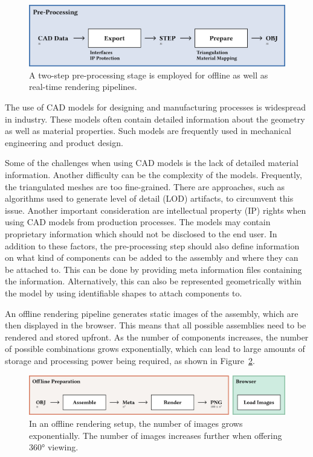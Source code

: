 \begin{figure}[H]
  \centering
  \includegraphics[width=0.9\columnwidth]{resources/cad-pipeline-preprocessing.png}
  \caption{A two-step pre-processing stage is employed for offline as well as real-time rendering pipelines.}
  \label{fig:cad-preprocessing}
\end{figure}

The use of CAD models for designing and manufacturing processes is widespread in industry. These models often contain detailed information about the geometry as well as material properties. Such models are frequently used in mechanical engineering and product design.

Some of the challenges when using CAD models is the lack of detailed material information. Another difficulty can be the complexity of the models. Frequently, the triangulated meshes are too fine-grained. There are approaches, such as algorithms used to generate level of detail (LOD) artifacts, to circumvent this issue.
Another important consideration are intellectual property (IP) rights when using CAD models from production processes. The models may contain proprietary information which should not be disclosed to the end user.
In addition to these factors, the pre-processing step should also define information on what kind of components can be added to the assembly and where they can be attached to. This can be done by providing meta information files containing the information. Alternatively, this can also be represented geometrically within the model by using identifiable shapes to attach components to.

An offline rendering pipeline generates static images of the assembly, which are then displayed in the browser. This means that all possible assemblies need to be rendered and stored upfront. As the number of components increases, the number of possible combinations grows exponentially, which can lead to large amounts of storage and processing power being required, as shown in Figure~\ref{fig:cad-offline}.

\begin{figure}[H]
  \includegraphics[width=\columnwidth]{resources/cad-pipeline-offline.png}
  \caption{In an offline rendering setup, the number of images grows exponentially. The number of images increases further when offering 360° viewing.}
  \label{fig:cad-offline}
\end{figure}


